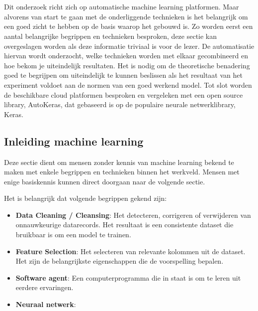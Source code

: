 \chapter{}
\label{ch:stand-van-zaken}



Dit onderzoek richt zich op automatische machine learning platformen. Maar alvorens van start te gaan met de onderliggende technieken is het belangrijk om een goed zicht te hebben op de basis waarop het gebouwd is. Zo worden eerst een aantal belangrijke begrippen en technieken besproken, deze sectie kan overgeslagen worden als deze informatie triviaal is voor de lezer. De automatisatie hiervan wordt onderzocht, welke technieken worden met elkaar gecombineerd en hoe bekom je uiteindelijk resultaten. Het is nodig om de theoretische benadering goed te begrijpen om uiteindelijk te kunnen beslissen als het resultaat van het experiment voldoet aan de normen van een goed werkend model. Tot slot worden de beschikbare cloud platformen besproken en vergeleken met een open source library, AutoKeras, dat gebaseerd is op de populaire neurale netwerklibrary, Keras. 

\section{Inleiding machine learning}
\label{sec:inl-machine-learning}

Deze sectie dient om mensen zonder kennis van machine learning bekend te maken met enkele begrippen en technieken binnen het werkveld. Mensen met enige basiskennis kunnen direct doorgaan naar de volgende sectie.

Het is belangrijk dat volgende begrippen gekend zijn:
\begin{itemize}
    \item \textbf{Data Cleaning / Cleansing}: Het detecteren, corrigeren of verwijderen van onnauwkeurige datarecords. Het resultaat is een consistente dataset die bruikbaar is om een model te trainen.
    \item \textbf{Feature Selection}: Het selecteren van relevante kolommen uit de dataset. Het zijn de belangrijkste eigenschappen die de voorspelling bepalen.
    \item \textbf{Software agent}: Een computerprogramma die in staat is om te leren uit eerdere ervaringen.
    \item \textbf{Neuraal netwerk}: 
\end{itemize}

